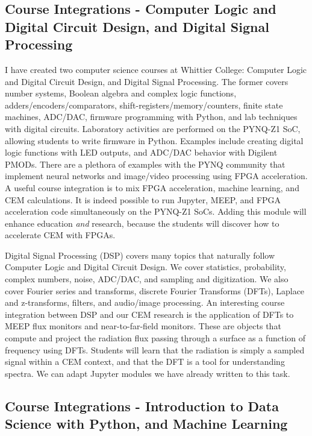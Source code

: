 \documentclass[11pt]{amsart}
\begin{document}
\subsection{Course Integrations - Computer Logic and Digital Circuit Design, and Digital Signal Processing}

I have created two computer science courses at Whittier College: Computer Logic and Digital Circuit Design, and Digital Signal Processing.  The former covers number systems, Boolean algebra and complex logic functions, adders/encoders/comparators, shift-registers/memory/counters, finite state machines, ADC/DAC, firmware programming with Python, and lab techniques with digital circuits.  Laboratory activities are performed on the PYNQ-Z1 SoC, allowing students to write firmware in Python.  Examples include creating digital logic functions with LED outputs, and ADC/DAC behavior with Digilent PMODs.  There are a plethora of examples with the PYNQ community that implement neural networks and image/video processing using FPGA acceleration.  A useful course integration is to mix FPGA acceleration, machine learning, and CEM calculations.  It is indeed possible to run Jupyter, MEEP, and FPGA acceleration code simultaneously on the PYNQ-Z1 SoCs.  Adding this module will enhance education \textit{and} research, because the students will discover how to accelerate CEM with FPGAs.

Digital Signal Processing (DSP) covers many topics that naturally follow Computer Logic and Digital Circuit Design.  We cover statistics, probability, complex numbers, noise, ADC/DAC, and sampling and digitization.  We also cover Fourier series and transforms, discrete Fourier Transforms (DFTs), Laplace and z-transforms, filters, and audio/image processing.  An interesting course integration between DSP and our CEM research is the application of DFTs to MEEP flux monitors and near-to-far-field monitors.  These are objects that compute and project the radiation flux passing through a surface as a function of frequency using DFTs.  Students will learn that the radiation is simply a sampled signal within a CEM context, and that the DFT is a tool for understanding spectra.  We can adapt Jupyter modules we have already written to this task. 

\subsection{Course Integrations - Introduction to Data Science with Python, and Machine Learning}
\end{document}
